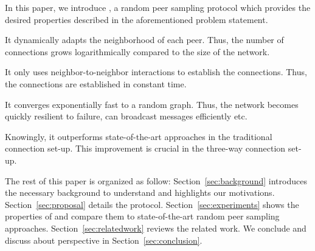 In this paper, we introduce \SCAMPLON{}, a random peer sampling protocol which
provides the desired properties described in the aforementioned problem
statement.
\begin{inparaenum}[(i)]
\item It dynamically adapts the neighborhood of each peer. Thus, the number of
  connections grows logarithmically compared to the size of the network.
\item It only uses neighbor-to-neighbor interactions to establish the
  connections. Thus, the connections are established in constant time.
\item It converges exponentially fast to a random graph. Thus, the network
  becomes quickly resilient to failure, can broadcast messages efficiently etc.
\end{inparaenum}
Knowingly, it outperforms state-of-the-art approaches in the traditional
connection set-up. This improvement is crucial in the three-way connection
set-up.


The rest of this paper is organized as follow: Section~\ref{sec:background}
introduces the necessary background to understand \SCAMPLON{} and highlights
our motivations. Section~\ref{sec:proposal} details the \SCAMPLON{} protocol.
Section~\ref{sec:experiments} shows the properties of \SCAMPLON{} and compare
them to state-of-the-art random peer sampling
approaches. Section~\ref{sec:relatedwork} reviews the related work. We conclude
and discuss about perspective in Section~\ref{sec:conclusion}.

